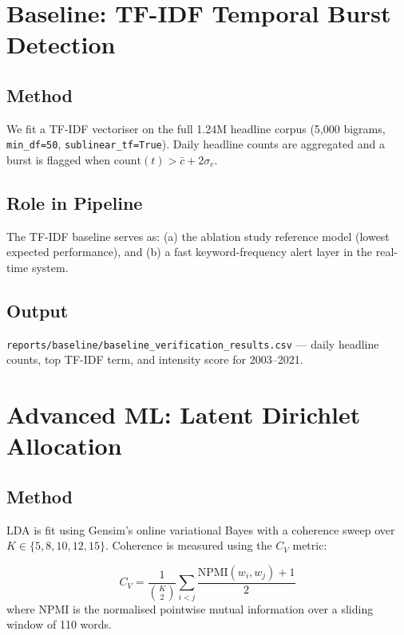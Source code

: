 \documentclass[12pt,a4paper]{article}
\begin{document}
\section{Baseline: TF-IDF Temporal Burst Detection}

\subsection{Method}

We fit a TF-IDF vectoriser on the full 1.24M headline corpus
(5,000 bigrams, \texttt{min\_df=50}, \texttt{sublinear\_tf=True}).
Daily headline counts are aggregated and a burst is flagged when
$\text{count}(t) > \bar{c} + 2\sigma_c$.

\subsection{Role in Pipeline}

The TF-IDF baseline serves as: (a) the ablation study reference model (lowest expected
performance), and (b) a fast keyword-frequency alert layer in the real-time system.

\subsection{Output}
\texttt{reports/baseline/baseline\_verification\_results.csv} — daily headline counts,
top TF-IDF term, and intensity score for 2003--2021.

\section{Advanced ML: Latent Dirichlet Allocation}

\subsection{Method}

LDA is fit using Gensim's online variational Bayes with a coherence sweep over
$K \in \{5, 8, 10, 12, 15\}$. Coherence is measured using the $C_V$ metric:

\begin{formulabox}
\[
C_V = \frac{1}{\binom{K}{2}} \sum_{i<j} \frac{\text{NPMI}(w_i, w_j) + 1}{2}
\]
where NPMI is the normalised pointwise mutual information over a sliding window of 110 words.
\end{formulabox}
\end{document}

